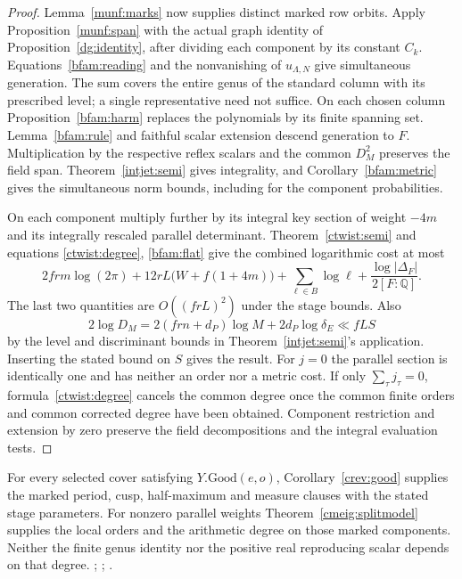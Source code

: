 \begin{proof}
Lemma~\ref{munf:marks} now supplies distinct marked row orbits.
Apply Proposition~\ref{munf:span} with the actual graph identity
of Proposition~\ref{dg:identity}, after dividing each component
by its constant \(C_k\). Equations~\eqref{bfam:reading} and the
nonvanishing of \(u_{\Lambda,N}\) give simultaneous generation.
The sum covers the entire genus of the standard column with its
prescribed level; a single representative need not suffice.
On each chosen column Proposition~\ref{bfam:harm} replaces the
polynomials by its finite spanning set. Lemma~\ref{bfam:rule}
and faithful scalar extension descend generation to \(F\).
Multiplication by the respective reflex scalars and the common
\(D_M^2\) preserves the field span. Theorem~\ref{intjet:semi}
gives integrality, and Corollary~\ref{bfam:metric} gives the
simultaneous norm bounds, including for the component probabilities.

On each component multiply further by its integral key section
of weight \(-4m\) and its integrally rescaled parallel determinant.
Theorem~\ref{ctwist:semi} and equations
\eqref{ctwist:degree}, \eqref{bfam:flat} give the combined
logarithmic cost at most
\[
  2frm\log(2\pi)+12rL\bigl(W+f(1+4m)\bigr)
  +\sum_{\ell\in B}\log\ell+
                    \frac{\log|\Delta_F|}{2[F:\mathbb Q]} .
\]
The last two quantities are \(O((frL)^2)\) under the stage
bounds. Also
\[
 2\log D_M=2(frn+d_P)\log M+2d_P\log\delta_E
                     \ll fL S
\]
by the level and discriminant bounds in
Theorem~\ref{intjet:semi}'s application.
Inserting the stated bound on \(S\) gives the result.
For \(j=0\) the parallel section is identically one and has
neither an order nor a metric cost. If only \(\sum_\tau j_\tau=0\),
formula~\eqref{ctwist:degree} cancels the common degree once
the common finite orders and common corrected degree have been
obtained. Component restriction and extension by zero preserve
the field decompositions and the integral evaluation tests.
\end{proof}
For every selected cover satisfying \(Y.\mathrm{Good}(e,o)\),
Corollary~\ref{crev:good} supplies the marked period, cusp,
half-maximum and measure clauses with the stated stage parameters.
For nonzero parallel weights
Theorem~\ref{cmeig:splitmodel} supplies the local orders and the
arithmetic degree on those marked components. Neither the finite
genus identity nor the positive real reproducing scalar depends
on that degree.
;
;
.



